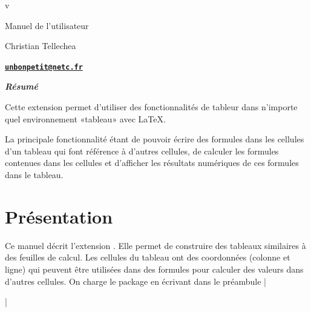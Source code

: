 \documentclass[french,a4paper,10pt]{article}
\makeatletter
\def\longfrdate@i#1/#2/#3\@nil{\number#3\relax\ifnum#3=1 \ier\fi\space\ifcase #2 \or janvier\or février\or mars\or avril\or mai\or juin\or juillet\or aout\or septembre\or octobre\or novembre\or décembre\fi\space#1}
\def\longfrdate{\expandafter\longfrdate@i\STdate\@nil}
\newcommand*\ST{\textsf{\STname}\xspace}
\makeatother
\begin{document}
\parindent0pt 
\pagestyle{fancy}
\begin{titlepage}
	\null\par\vfill
	\begin{center}
		\begin{minipage}{0.75\linewidth}
			\begin{center}
				\Huge\bfseries\ST\par\vspace{5pt}
				\small v\STver\par\vspace{35pt}
				\normalsize Manuel de l'utilisateur
			\end{center}
		\end{minipage}
	\end{center}
	\vspace{1cm}
	\begin{center}
		Christian {\sc Tellechea}\par\small
		\href{mailto:unbonpetit@netc.fr}{\texttt{\textbf{unbonpetit@netc.fr}}}\par\vspace{5pt}
		\longfrdate
	\end{center}
	\vfill
	\begin{center}
		\begin{minipage}{0.8\linewidth}
			\noindent\hrulefill\par
			\hfill\textbf{\textit{Résumé}}\hfill{}\medskip\par\footnotesize
				Cette extension permet d'utiliser des fonctionnalités de tableur dans n'importe quel environnement «tableau» avec \LaTeX{}.\par\smallskip
				La principale fonctionnalité étant de pouvoir écrire des formules dans les cellules d'un tableau qui font référence à d'autres cellules, de calculer les formules contenues dans les cellules et d'afficher les résultats numériques de ces formules dans le tableau.\par
			\hrulefill
		\end{minipage}
	\end{center}
	\vfill{}
\end{titlepage}

\tableofcontents\newpage
\parskip\medskipamount
\section{Présentation}
Ce manuel décrit l'extension \ST. Elle permet de construire des tableaux similaires à des feuilles de calcul. Les cellules du tableau ont des coordonnées (colonne et ligne) qui peuvent être utilisées dans des formules pour calculer des valeurs dans d'autres cellules. On charge le package en écrivant dans le préambule
\centerverb|\usepackage{spreadtab}|
\end{document}
